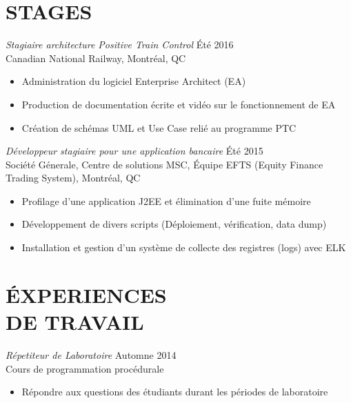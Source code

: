 \documentclass[margin, 10pt]{res} %
\begin{document}
\begin{resume}
\section{ STAGES}

{\sl Stagiaire architecture Positive Train Control} \hfill \'Et\'e 2016 \\
Canadian National Railway, Montr\'eal, QC
\begin{itemize} \itemsep -2pt %
\item Administration du logiciel Enterprise Architect (EA)
\item Production de documentation \'ecrite et vid\'eo sur le fonctionnement de EA
\item Cr\'eation de sch\'emas UML et Use Case reli\'e au programme PTC
\end{itemize}

{\sl D\'eveloppeur stagiaire pour une application bancaire} \hfill \'Et\'e 2015 \\
Soci\'et\' e G\'enerale, Centre de solutions MSC, \'Equipe EFTS (Equity Finance Trading System), Montr\'eal, QC
\begin{itemize} \itemsep -2pt %
\item Profilage d'une application J2EE et \'elimination d'une fuite m\'emoire
\item  D\'eveloppement de divers scripts (D\'eploiement, v\'erification, data dump)
\item  Installation et gestion d'un syst\`eme de collecte des registres (logs) avec ELK
\end{itemize}
 
 
\section{\'EXPERIENCES \\ DE TRAVAIL}

{\sl R\'epetiteur de Laboratoire} \hfill Automne 2014 \\
Cours de programmation proc\'edurale
\begin{itemize} \itemsep -2pt %
\item R\'epondre aux questions des \'etudiants durant les p\'eriodes de laboratoire
\end{itemize}


\end{resume}
\end{document}
